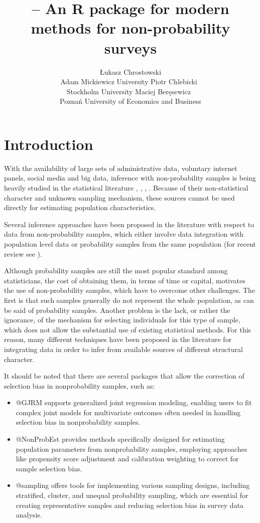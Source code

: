\documentclass[
]{jss}
\author{
Łukasz Chrostowski\\Adam Mickiewicz University \And Piotr
Chlebicki~\orcidlink{0009-0006-4867-7434}\\Stockholm University
\AND Maciej Beręsewicz~\orcidlink{0000-0002-8281-4301}\\Poznań
University of Economics and Business
}
\title{\pkg{nonprobsvy} -- An R package for modern methods for
non-probability surveys}
\begin{document}
\hypertarget{introduction}{%
\section{Introduction}\label{introduction}}

With the availability of large sets of administrative data, voluntary
internet panels, social media and big data, inference with
non-probability samples is being heavily studied in the statistical
literature \citet{beaumont2020probability},
\citet{elliott_inference_2017}, \citet{berkesewicz2017two},
\citet{citro2014multiple}. Because of their non-statistical character
and unknown sampling mechanism, these sources cannot be used directly
for estimating population characteristics.

Several inference approaches have been proposed in the literature with
respect to data from non-probability samples, which either involve data
integration with population level data or probability samples from the
same population (for recent review see \citet{wu2022statistical}).

Although probability samples are still the most popular standard among
statisticians, the cost of obtaining them, in terms of time or capital,
motivates the use of non-probability samples, which have to overcome
other challenges. The first is that such samples generally do not
represent the whole population, as can be said of probability samples.
Another problem is the lack, or rather the ignorance, of the mechanism
for selecting individuals for this type of sample, which does not allow
the substantial use of existing statistical methods. For this reason,
many different techniques have been proposed in the literature for
integrating data in order to infer from available sources of different
structural character.

It should be noted that there are several packages that allow the
correction of selection bias in nonprobability samples, such as:

\begin{itemize}
\item @GJRM supports generalized joint regression modeling, enabling users to fit complex joint models for multivariate outcomes often needed in handling selection bias in nonprobability samples.
\item @NonProbEst provides methods specifically designed for estimating population parameters from nonprobability samples, employing approaches like propensity score adjustment and calibration weighting to correct for sample selection bias.
\item @sampling offers tools for implementing various sampling designs, including stratified, cluster, and unequal probability sampling, which are essential for creating representative samples and reducing selection bias in survey data analysis.
\end{itemize}
\end{document}
